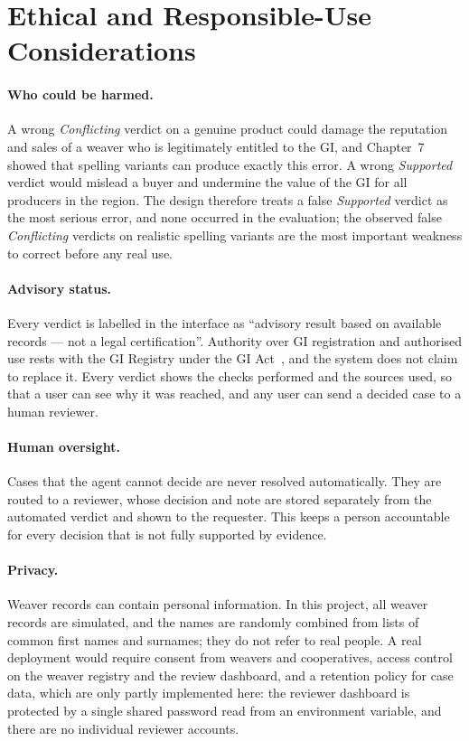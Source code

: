 \section{Ethical and Responsible-Use Considerations}

\paragraph{Who could be harmed.} A wrong \emph{Conflicting} verdict on a genuine product could damage the
reputation and sales of a weaver who is legitimately entitled to the GI, and Chapter~7 showed that
spelling variants can produce exactly this error. A wrong \emph{Supported} verdict would mislead a buyer
and undermine the value of the GI for all producers in the region. The design therefore treats a false
\emph{Supported} verdict as the most serious error, and none occurred in the evaluation; the observed
false \emph{Conflicting} verdicts on realistic spelling variants are the most important weakness to
correct before any real use.

\paragraph{Advisory status.} Every verdict is labelled in the interface as ``advisory result based on
available records --- not a legal certification''. Authority over GI registration and authorised use
rests with the GI Registry under the GI Act~\cite{giact1999}, and the system does not claim to replace
it. Every verdict shows the checks performed and the sources used, so that a user can see why it was
reached, and any user can send a decided case to a human reviewer.

\paragraph{Human oversight.} Cases that the agent cannot decide are never resolved automatically. They
are routed to a reviewer, whose decision and note are stored separately from the automated verdict and
shown to the requester. This keeps a person accountable for every decision that is not fully supported
by evidence.

\paragraph{Privacy.} Weaver records can contain personal information. In this project, all weaver
records are simulated, and the names are randomly combined from lists of common first names and
surnames; they do not refer to real people. A real deployment would require consent from weavers and
cooperatives, access control on the weaver registry and the review dashboard, and a retention policy
for case data, which are only partly implemented here: the reviewer dashboard is protected by a single shared password read from an environment variable, and there are no individual reviewer accounts.

